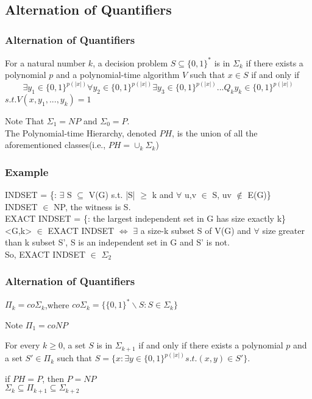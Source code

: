 \documentclass{beamer}
\begin{document}
\subsection{Alternation of Quantifiers}
\begin{frame}
\frametitle{Alternation of Quantifiers}
\begin{definition}
	For a natural number $k$, a decision problem $S \subseteq \{0,1\}^{*}$ is in $\Sigma_{k}$ if there exists a polynomial $p$ and a polynomial-time algorithm $V$ such that $x \in S$ if and only if 
	$$
	\exists y_{1} \in \{0,1\}^{p(|x|)} \forall y_{2} \in \{0,1\}^{p(|x|)} \exists y_{3} \in \{0,1\}^{p(|x|)}...Q_{k} y_{k} \in \{0,1\}^{p(|x|)}
	$$
	$s.t. V(x,y_{1},...,y_{k}) = 1$
\end{definition}
Note That $\Sigma_{1} = NP$ and $\Sigma_{0} = P$.\\
The Polynomial-time Hierarchy, denoted $PH$, is the union of all the aforementioned classes(i.e., $PH = \cup_{k}\Sigma_{k}$)
\end{frame}
\begin{frame}
\frametitle{Example}
	INDSET = \{<G,k>: $\exists$ S $\subseteq$ V(G) s.t. |S| $\geq$ k and $\forall$ u,v $\in$ S, uv $\notin$ E(G)\}\\
	INDSET $\in$ NP, the witness is S.\\
	EXACT INDSET = \{<G,k>: the largest independent set in G has size exactly k\}\\
	<G,k> $\in$ EXACT INDSET $\Leftrightarrow$ $\exists$ a size-k subset S of V(G) and $\forall$ size greater than k subset S', S is an independent set in G and S' is not.\\
	So, EXACT INDSET $\in$ $\Sigma_{2}$
\end{frame}
\begin{frame}
\frametitle{Alternation of Quantifiers}
\begin{definition}
$\Pi_{k} = co\Sigma_{k}$,where $co\Sigma_{k} = \{\{0,1\}^{*} \backslash S:S \in \Sigma_{k}\}$
\end{definition}
Note $\Pi_{1} = coNP$
\begin{theorem}
For every $k \geq 0$, a set $S$ is in $\Sigma_{k+1}$ if and only if there exists a polynomial $p$ and a set $S' \in \Pi_{k}$ such that $S =\{x : \exists y \in \{0, 1\}^{p(|x|)} s.t. (x, y) \in S'\}$.
\end{theorem}
if $PH = P$, then $P = NP$\\
$\Sigma_{k} \subseteq \Pi_{k+1} \subseteq \Sigma_{k+2}$
\end{frame}
\end{document}
